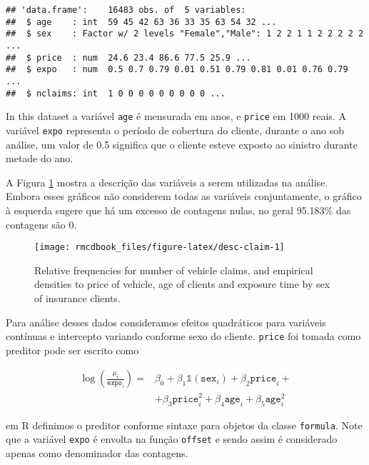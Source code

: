 \documentclass[9pt,a5paper,]{book}
\theoremstyle{definition}
\theoremstyle{definition}
\theoremstyle{remark}
\begin{document}
\begin{verbatim}
## 'data.frame':    16483 obs. of  5 variables:
##  $ age    : int  59 45 42 63 36 33 35 63 54 32 ...
##  $ sex    : Factor w/ 2 levels "Female","Male": 1 2 2 1 1 2 2 2 2 2 ...
##  $ price  : num  24.6 23.4 86.6 77.5 25.9 ...
##  $ expo   : num  0.5 0.7 0.79 0.01 0.51 0.79 0.81 0.01 0.76 0.79 ...
##  $ nclaims: int  1 0 0 0 0 0 0 0 0 0 ...
\end{verbatim}

In this dataset a variável \texttt{age} é mensurada em anos, e
\texttt{price} em 1000 reais. A variável \texttt{expo} representa o
período de cobertura do cliente, durante o ano sob análise, um valor de
0.5 significa que o cliente esteve exposto ao sinistro durante metade do
ano.

A Figura \ref{fig:desc-claim} mostra a descrição das variáveis a serem
utilizadas na análise. Embora esses gráficos não considerem todas as
variáveis conjuntamente, o gráfico à esquerda sugere que há um excesso
de contagens nulas, no geral 95.183\% das contagens são 0.

\begin{figure}[h]

{\centering \texttt{[image: rmcdbook\_files/figure-latex/desc-claim-1]} 

}

\caption{Relative frequencies for number of vehicle claims, and empirical densities to price of vehicle, age of clients and exposure time by sex of insurance clients.}\label{fig:desc-claim}
\end{figure}

Para análise desses dados consideramos efeitos quadráticos para
variáveis contínuas e intercepto variando conforme sexo do cliente.
\texttt{price} foi tomada como preditor pode ser escrito como

\begin{equation*}
  \begin{split}
  \log\left ( \frac{\mu_i}{\texttt{expo}_i} \right ) = &
  \beta_0 + \beta_1 \mathbb{1}(\texttt{sex}_i) +
  \beta_2 \texttt{price}_i + \\
  & + \beta_3 \texttt{price}_i^2 +
  \beta_4 \texttt{age}_i +
  \beta_5 \texttt{age}_i^2
  \end{split}
\end{equation*}

em R definimos o preditor conforme sintaxe para objetos da classe
\texttt{formula}. Note que a variável \texttt{expo} é envolta na função
\texttt{offset} e sendo assim é considerado apenas como denominador das
contagens.
\end{document}
